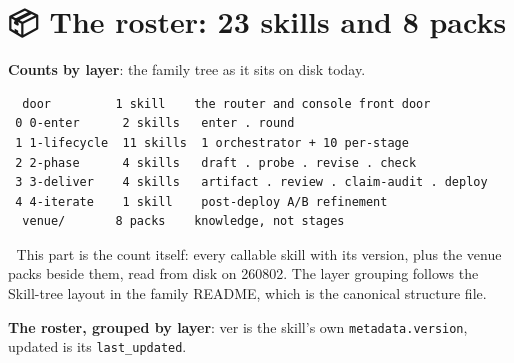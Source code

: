 
\section{📦 The roster: 23 skills and 8 packs}
\textbf{Counts by layer}: the family tree as it sits on disk today.

\begin{verbatim}
  door         1 skill    the router and console front door
 0 0-enter      2 skills   enter . round
 1 1-lifecycle  11 skills  1 orchestrator + 10 per-stage
 2 2-phase      4 skills   draft . probe . revise . check
 3 3-deliver    4 skills   artifact . review . claim-audit . deploy
 4 4-iterate    1 skill    post-deploy A/B refinement
  venue/       8 packs    knowledge, not stages
\end{verbatim}
📌 This part is the count itself: every callable skill with its version, plus the venue packs beside them, read from disk on 260802. The layer grouping follows the Skill-tree layout in the family README, which is the canonical structure file.

\textbf{The roster, grouped by layer}: ver is the skill's own \texttt{metadata.version}, updated is its \texttt{last\_updated}.

